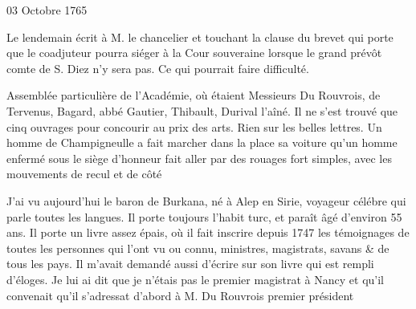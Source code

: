                      \begin{diary}{03 Octobre 1765}{}
                        
                         Le lendemain écrit à M. le chancelier et
                           touchant la clause du brevet qui porte
                           que le coadjuteur pourra siéger à la
                              Cour
                              souveraine lorsque le grand prévôt comte de
                              S. Diez n'y sera pas. Ce qui pourrait
                           faire difficulté. \bigskip
        
        
                         Assemblée particulière de l'Académie,
                           où étaient Messieurs
                           Du Rouvrois, de Tervenus, Bagard,
                              abbé Gautier, Thibault, Durival l'aîné.
                           Il ne s'est trouvé que cinq ouvrages pour
                           concourir au prix des arts. Rien sur les
                           belles lettres. Un homme de Champigneulle
                           a fait marcher dans la place sa voiture
                           qu'un homme enfermé sous le siège d'honneur
                           fait aller par des rouages fort simples,
                           avec les mouvements de recul et de côté \bigskip
        
        
                         J'ai vu aujourd'hui le baron de Burkana,
                           né à Alep en Sirie, voyageur
                           célébre qui parle
                           toutes les langues. Il porte toujours l'habit turc,
                           et paraît âgé d'environ 55 ans. Il porte
                           un livre assez épais, où il fait inscrire depuis
                              1747 les témoignages de toutes les personnes qui
                           l'ont vu ou connu, ministres, magistrats,
                           savans & de tous les pays. Il m'avait demandé
                           aussi d'écrire sur son livre qui est rempli
                           d'éloges. Je lui ai dit que je n'étais pas le premier
                           magistrat à Nancy et qu'il
                           convenait qu'il
                           s'adressat d'abord à M. Du
                              Rouvrois
                           premier président
                        \bigskip
        
        
                     \end{diary}

